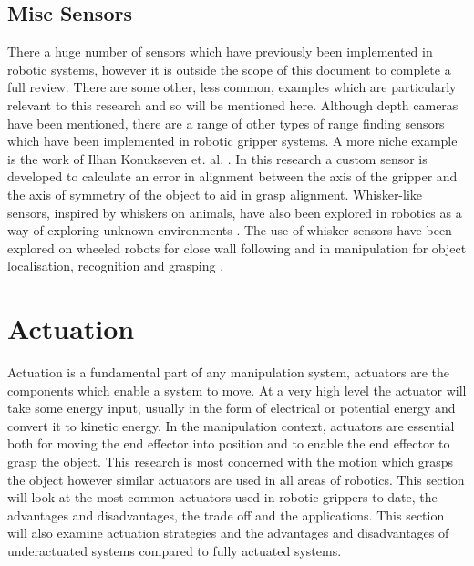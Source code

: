\subsection{Misc Sensors}

There a huge number of sensors which have previously been implemented in robotic systems, however it is outside the scope of this document to complete a full review. There are some other, less common, examples which are particularly relevant to this research and so will be mentioned here. Although depth cameras have been mentioned, there are a range of other types of range finding sensors which have been implemented in robotic gripper systems. A more niche example is the work of Ilhan Konukseven et. al. \cite{FingertipEmitterReceiverMovingObjectII, FingertipEmitterReceiverMovingObject}. In this research a custom sensor is developed to calculate an error in alignment between the axis of the gripper and the axis of symmetry of the object to aid in grasp alignment. Whisker-like sensors, inspired by whiskers on animals, have also been explored in robotics as a way of exploring unknown environments \cite{2000Konukseven}. The use of whisker sensors have been explored on wheeled robots for close wall following \cite{CloseWallFollowing} and in manipulation for object localisation, recognition and grasping \cite{TactilePerception}.


\section{Actuation}\label{Actuation}
Actuation is a fundamental part of any manipulation system, actuators are the components which enable a system to move. At a very high level the actuator will take some energy input, usually in the form of electrical or potential energy and convert it to kinetic energy. In the manipulation context, actuators are essential both for moving the end effector into position and to enable the end effector to grasp the object. This research is most concerned with the motion which grasps the object however similar actuators are used in all areas of robotics. This section will look at the most common actuators used in robotic grippers to date, the advantages and disadvantages, the trade off and the applications. This section will also examine actuation strategies and the advantages and disadvantages of underactuated systems compared to fully actuated systems.

